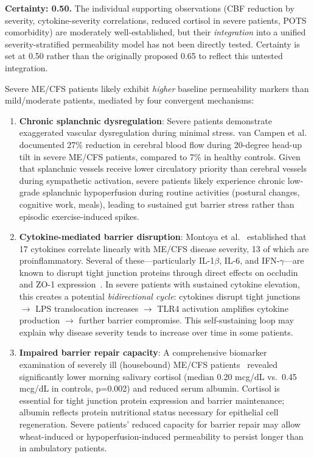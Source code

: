 \begin{hypothesis}
\label{hyp:severity-gut-permeability}
\textbf{Certainty: 0.50.} The individual supporting observations (CBF reduction by severity, cytokine-severity correlations, reduced cortisol in severe patients, POTS comorbidity) are moderately well-established, but their \emph{integration} into a unified severity-stratified permeability model has not been directly tested. Certainty is set at 0.50 rather than the originally proposed 0.65 to reflect this untested integration.

Severe ME/CFS patients likely exhibit \textit{higher} baseline permeability markers than mild/moderate patients, mediated by four convergent mechanisms:

\begin{enumerate}
    \item \textbf{Chronic splanchnic dysregulation}: Severe patients demonstrate exaggerated vascular dysregulation during minimal stress. van Campen et al.~\cite{VanCampen2020SeverityCPET} documented 27\% reduction in cerebral blood flow during 20-degree head-up tilt in severe ME/CFS patients, compared to 7\% in healthy controls. Given that splanchnic vessels receive lower circulatory priority than cerebral vessels during sympathetic activation, severe patients likely experience chronic low-grade splanchnic hypoperfusion during routine activities (postural changes, cognitive work, meals), leading to sustained gut barrier stress rather than episodic exercise-induced spikes.

    \item \textbf{Cytokine-mediated barrier disruption}: Montoya et al.~\cite{Montoya2017} established that 17 cytokines correlate linearly with ME/CFS disease severity, 13 of which are proinflammatory. Several of these---particularly IL-1$\beta$, IL-6, and IFN-$\gamma$---are known to disrupt tight junction proteins through direct effects on occludin and ZO-1 expression~\cite{Montoya2017}. In severe patients with sustained cytokine elevation, this creates a potential \textit{bidirectional cycle}: cytokines disrupt tight junctions $\rightarrow$ LPS translocation increases $\rightarrow$ TLR4 activation amplifies cytokine production $\rightarrow$ further barrier compromise. This self-sustaining loop may explain why disease severity tends to increase over time in some patients.

    \item \textbf{Impaired barrier repair capacity}: A comprehensive biomarker examination of severely ill (housebound) ME/CFS patients~\cite{Komaroff2021severe} revealed significantly lower morning salivary cortisol (median 0.20 mcg/dL vs.\ 0.45 mcg/dL in controls, p=0.002) and reduced serum albumin. Cortisol is essential for tight junction protein expression and barrier maintenance; albumin reflects protein nutritional status necessary for epithelial cell regeneration. Severe patients' reduced capacity for barrier repair may allow wheat-induced or hypoperfusion-induced permeability to persist longer than in ambulatory patients.


\end{enumerate}
\end{hypothesis}

